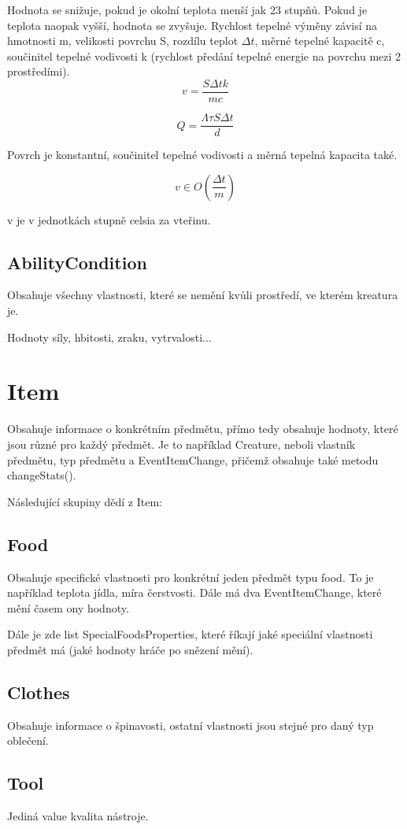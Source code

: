 \documentclass[12pt,a4paper]{report}
\begin{document}
Hodnota se snižuje, pokud je okolní teplota menší jak 23 stupňů. Pokud je teplota naopak vyšší, hodnota se zvyšuje. 
Rychlost tepelné výměny závisí na hmotnosti m, velikosti povrchu S, rozdílu teplot $\Delta t$, měrné tepelné kapacitě c, součinitel tepelné vodivosti k (rychlost předání tepelné energie na povrchu mezi 2 prostředími).   
$$ v = \frac{S \Delta t k}{m c} $$

$$  Q = \frac{\Lambda \tau S \Delta t}{d} $$

Povrch je konstantní, součinitel tepelné vodivosti a měrná tepelná kapacita také. 

$$ v \in O(\frac{\Delta t}{m})$$

v je v jednotkách stupně celsia za vteřinu.

\subsection{AbilityCondition}
Obsahuje všechny vlastnosti, které se nemění kvůli prostředí, ve kterém kreatura je.

Hodnoty síly, hbitosti, zraku, vytrvalosti...

\section{Item}
Obsahuje informace o konkrétním předmětu, přímo tedy obsahuje hodnoty, které jsou různé pro každý předmět. Je to například Creature, neboli vlastník předmětu, typ předmětu a EventItemChange, přičemž obsahuje také metodu changeStats().

Následující skupiny dědí z Item:

\subsection{Food}
Obsahuje specifické vlastnosti pro konkrétní jeden předmět typu food. To je například teplota jídla, míra čerstvosti. 
Dále má dva EventItemChange, které mění časem ony hodnoty.

Dále je zde list SpecialFoodsProperties, které říkají jaké speciální vlastnosti předmět má (jaké hodnoty hráče po snězení mění).

\subsection{Clothes}
Obsahuje informace o špinavosti, ostatní vlastnosti jsou stejné pro daný typ oblečení.

\subsection{Tool}
Jediná value kvalita nástroje.
\end{document}

